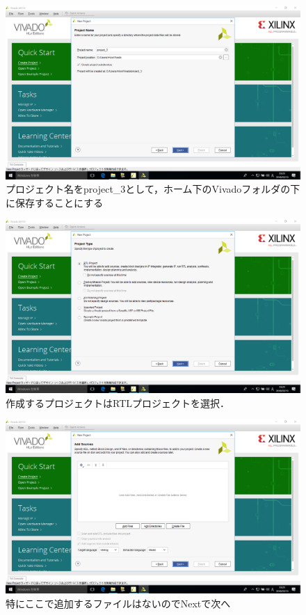 \documentclass[a4paper,dvipdfmx]{jsarticle}
\begin{document}
 \begin{figure}[H]
  \begin{center}
   \includegraphics[width=.8\textwidth]{chapter08_figures/VirtualBox_Windows10_19_03_2018_23_23_26.png}
  \end{center}
  \caption{プロジェクト名をproject\_3として，ホーム下のVivadoフォルダの下に保存することにする}
 \end{figure}

 \begin{figure}[H]
  \begin{center}
   \includegraphics[width=.8\textwidth]{chapter08_figures/VirtualBox_Windows10_19_03_2018_23_23_30.png}
  \end{center}
  \caption{作成するプロジェクトはRTLプロジェクトを選択．}
 \end{figure}

 \begin{figure}[H]
  \begin{center}
   \includegraphics[width=.8\textwidth]{chapter08_figures/VirtualBox_Windows10_19_03_2018_23_23_35.png}
  \end{center}
  \caption{特にここで追加するファイルはないのでNextで次へ}
 \end{figure}
\end{document}
